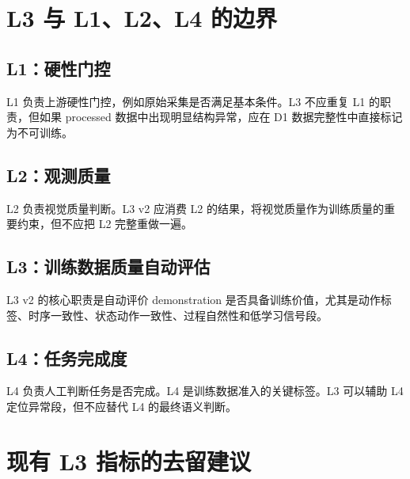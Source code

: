 \documentclass[UTF8,zihao=-4]{ctexart}
\begin{document}
\section{L3 与 L1、L2、L4 的边界}

\subsection{L1：硬性门控}

L1 负责上游硬性门控，例如原始采集是否满足基本条件。L3 不应重复 L1 的职责，但如果 processed 数据中出现明显结构异常，应在 D1 数据完整性中直接标记为不可训练。

\subsection{L2：观测质量}

L2 负责视觉质量判断。L3 v2 应消费 L2 的结果，将视觉质量作为训练质量的重要约束，但不应把 L2 完整重做一遍。

\subsection{L3：训练数据质量自动评估}

L3 v2 的核心职责是自动评价 demonstration 是否具备训练价值，尤其是动作标签、时序一致性、状态动作一致性、过程自然性和低学习信号段。

\subsection{L4：任务完成度}

L4 负责人工判断任务是否完成。L4 是训练数据准入的关键标签。L3 可以辅助 L4 定位异常段，但不应替代 L4 的最终语义判断。

\section{现有 L3 指标的去留建议}
\end{document}
